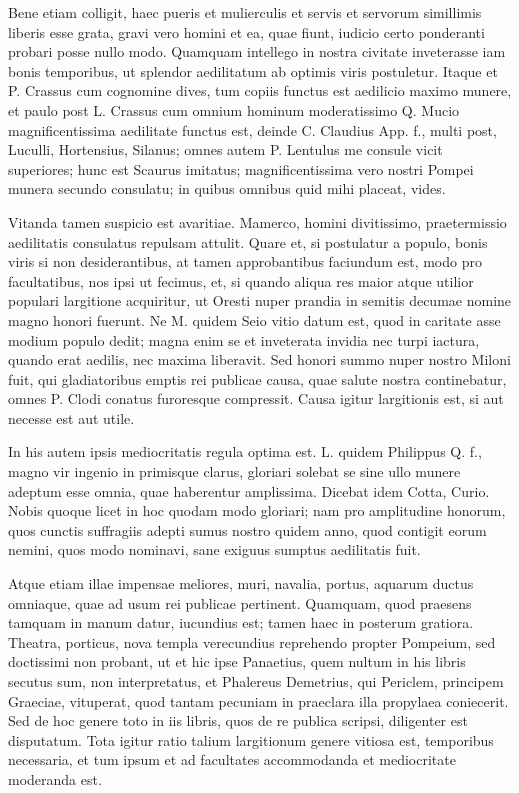  Bene etiam colligit, haec pueris et mulierculis et servis et servorum simillimis liberis esse grata, gravi vero homini et ea, quae fiunt, iudicio certo ponderanti probari posse nullo modo. Quamquam intellego in nostra civitate inveterasse iam bonis temporibus, ut splendor aedilitatum ab optimis viris postuletur. Itaque et P. Crassus cum cognomine dives, tum copiis functus est aedilicio maximo munere, et paulo post L. Crassus cum omnium hominum moderatissimo Q. Mucio magnificentissima aedilitate functus est, deinde C. Claudius App. f., multi post, Luculli, Hortensius, Silanus; omnes autem P. Lentulus me consule vicit superiores; hunc est Scaurus imitatus; magnificentissima vero nostri Pompei munera secundo consulatu; in quibus omnibus quid mihi placeat, vides.

 Vitanda tamen suspicio est avaritiae. Mamerco, homini divitissimo, praetermissio aedilitatis consulatus repulsam attulit. Quare et, si postulatur a populo, bonis viris si non desiderantibus, at tamen approbantibus faciundum est, modo pro facultatibus, nos ipsi ut fecimus, et, si quando aliqua res maior atque utilior populari largitione acquiritur, ut Oresti nuper prandia in semitis decumae nomine magno honori fuerunt. Ne M. quidem Seio vitio datum est, quod in caritate asse modium populo dedit; magna enim se et inveterata invidia nec turpi iactura, quando erat aedilis, nec maxima liberavit. Sed honori summo nuper nostro Miloni fuit, qui gladiatoribus emptis rei publicae causa, quae salute nostra continebatur, omnes P. Clodi conatus furoresque compressit. Causa igitur largitionis est, si aut necesse est aut utile.

 In his autem ipsis mediocritatis regula optima est. L. quidem Philippus Q. f., magno vir ingenio in primisque clarus, gloriari solebat se sine ullo munere adeptum esse omnia, quae haberentur amplissima. Dicebat idem Cotta, Curio. Nobis quoque licet in hoc quodam modo gloriari; nam pro amplitudine honorum, quos cunctis suffragiis adepti sumus nostro quidem anno, quod contigit eorum nemini, quos modo nominavi, sane exiguus sumptus aedilitatis fuit.

 Atque etiam illae impensae meliores, muri, navalia, portus, aquarum ductus omniaque, quae ad usum rei publicae pertinent. Quamquam, quod praesens tamquam in manum datur, iucundius est; tamen haec in posterum gratiora. Theatra, porticus, nova templa verecundius reprehendo propter Pompeium, sed doctissimi non probant, ut et hic ipse Panaetius, quem nultum in his libris secutus sum, non interpretatus, et Phalereus Demetrius, qui Periclem, principem Graeciae, vituperat, quod tantam pecuniam in praeclara illa propylaea coniecerit. Sed de hoc genere toto in iis libris, quos de re publica scripsi, diligenter est disputatum. Tota igitur ratio talium largitionum genere vitiosa est, temporibus necessaria, et tum ipsum et ad facultates accommodanda et mediocritate moderanda est.

